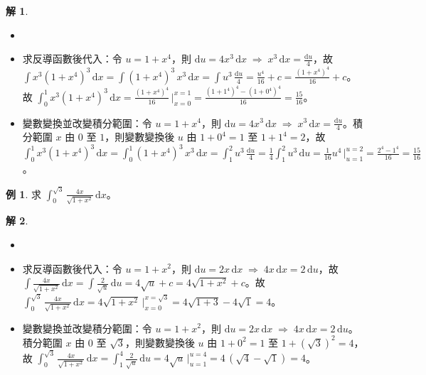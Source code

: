 \documentclass[12pt]{extarticle}
\newcommand{\ds}{\displaystyle}
\newcommand{\ie}{\;\Longrightarrow\;}
\theoremstyle{definition}
\newtheorem*{ex}{例}
\newtheorem*{sol}{解}
\begin{document}
\begin{sol}
  \begin{itemize}\setlength{\itemsep}{0pt}
    \item[]
    \item 求反導函數後代入：令 $\ds u = 1 + x^4$，則 $\ds\text{d}u = 4 x^3\,\text{d}x\ie x^3\,\text{d}x = \frac{\text{d}u}{4}$，故 $\ds\int x^3(1 + x^4)^3\,\text{d}x = \int (1 + x^4)^3\,x^3\,\text{d}x = \int u^3\,\frac{\text{d}u}{4} = \frac{u^4}{16} + c = \frac{(1 + x^4)^4}{16} + c$。故 $\ds\int_0^1 x^3(1 + x^4)^3\,\text{d}x = \frac{(1 + x^4)^4}{16}\,\Big|_{x = 0}^{x = 1} = \frac{(1 + 1^4)^4 - (1 + 0^4)^4}{16} = \frac{15}{16}$。
    \item 變數變換並改變積分範圍：令 $\ds u = 1 + x^4$，則 $\ds\text{d}u = 4 x^3\,\text{d}x\ie x^3\,\text{d}x = \frac{\text{d}u}{4}$。積分範圍 $x$ 由 $0$ 至 $1$，則變數變換後 $u$ 由 $\ds 1 + 0^4 = 1$ 至 $\ds1 + 1^4 = 2$，故 $\ds\int_0^1 x^3(1 + x^4)^3\,\text{d}x = \int_0^1 (1 + x^4)^3\,x^3\,\text{d}x = \int_1^2 u^3\,\frac{\text{d}u}{4} = \frac{1}{4}\int_1^2 u^3\,\text{d}u = \frac{1}{16} u^4\,\Big|_{u = 1}^{u = 2} = \frac{2^4 - 1^4}{16} = \frac{15}{16}$。
  \end{itemize}
\end{sol}

\begin{ex}
  求 $\ds\int_0^{\sqrt{3}}\frac{4x}{\sqrt{1 + x^2}}\,\text{d}x$。
\end{ex}

\begin{sol}
  \begin{itemize}\setlength{\itemsep}{0pt}
    \item[]
    \item 求反導函數後代入：令 $\ds u = 1 + x^2$，則 $\ds\text{d}u = 2 x\,\text{d}x\ie 4x\,\text{d}x = 2\,\text{d}u$，故 $\ds\int\!\frac{4x}{\sqrt{1 + x^2}}\,\text{d}x = \int\!\frac{2}{\sqrt{u}}\,\text{d}u = 4\sqrt{u} + c = 4\sqrt{1 + x^2} + c$。故 $\ds\int_0^{\sqrt{3}}\frac{4x}{\sqrt{1 + x^2}}\,\text{d}x = 4\sqrt{1 + x^2}\,\Big|_{x = 0}^{x = \sqrt{3}} = 4\sqrt{1 + 3} - 4\sqrt{1} = 4$。
    \item 變數變換並改變積分範圍：令 $\ds u = 1 + x^2$，則 $\ds\text{d}u = 2 x\,\text{d}x\ie 4x\,\text{d}x = 2\,\text{d}u$。積分範圍 $x$ 由 $0$ 至 $\sqrt{3}$，則變數變換後 $u$ 由 $\ds1 + 0^2 = 1$ 至 $\ds1 + (\sqrt{3})^2 = 4$，故 $\ds\int_0^{\sqrt{3}}\frac{4x}{\sqrt{1 + x^2}}\,\text{d}x = \int_1^4 \frac{2}{\sqrt{u}}\,\text{d}u = 4\sqrt{u}\,\Big|_{u = 1}^{u = 4} = 4\,(\sqrt{4} - \sqrt{1}) = 4$。
  \end{itemize}
\end{sol}
\end{document}
